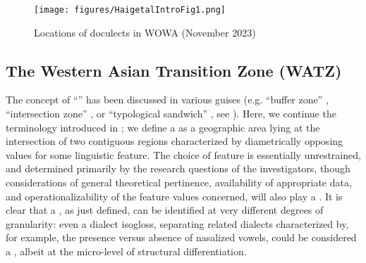 \documentclass[output=paper,colorlinks,citecolor=brown,collectionchapter]{langscibook}
\begin{document}
\begin{figure}
    \texttt{[image: figures/HaigetalIntroFig1.png]}
    \caption{Locations of doculects in WOWA (November 2023)}
    \label{Intro:fig:1:doculacts}
\end{figure}

\subsection{The Western Asian Transition Zone (WATZ)}\label{Intro:ss:1.2}

The concept of ``'' has been discussed in various guises (e.g. ``buffer zone'' \citealt{Stilo2005IranianBuffer}, ``intersection zone'' \citealt{stilo_circumpositions_2009}, or ``typological sandwich'' \citealt{szeto_sinitic_2021}, see \citealt{haig_which_2023}). Here, we continue the terminology introduced in \citet{haig_introduction_2018}; we define a  as a geographic area lying at the intersection of two contiguous regions characterized by diametrically opposing values for some linguistic feature. The choice of feature is essentially unrestrained, and determined primarily by the research questions of the investigators, though considerations of general theoretical pertinence, availability of appropriate data, and operationalizability of the feature values concerned, will also play a . It is clear that a , as just defined, can be identified at very different degrees of granularity: even a dialect isogloss, separating related dialects characterized by, for example, the presence versus absence of nasalized vowels, could be considered a , albeit at the micro-level of structural differentiation. 
\end{document}

